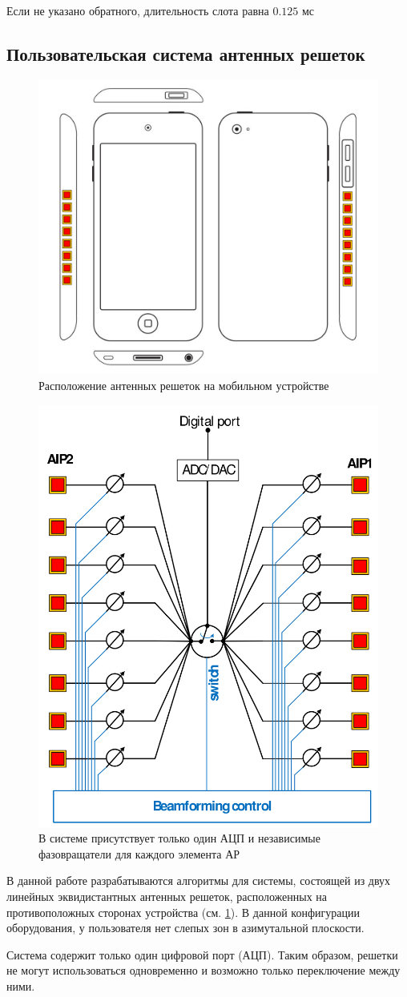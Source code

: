 Если не указано обратного, длительность слота равна $0.125$ мс
\subsection{Пользовательская система антенных решеток}

\begin{figure}[ht]
    \centering
    \includegraphics[width=0.5\linewidth]{figs/fig4.3}
    \caption{Расположение антенных решеток на мобильном устройстве}
    \label{fig:4.3}
\end{figure}

\begin{figure}[ht]
    \centering
    \includegraphics[width=0.4\linewidth]{figs/fig4.4}
    \caption{В системе присутствует только один АЦП и независимые фазовращатели для каждого элемента АР}
    \label{fig:4.4}
\end{figure}

В данной работе разрабатываются алгоритмы для системы, состоящей из двух линейных эквидистантных антенных решеток, расположенных на противоположных сторонах
устройства (см. \ref{fig:4.3}). В данной конфигурации оборудования, у пользователя нет слепых зон в азимутальной плоскости.

Система содержит только один цифровой порт (АЦП). Таким образом, решетки не могут
использоваться одновременно и возможно только переключение между ними.

